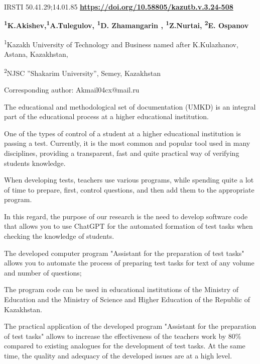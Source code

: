 \newpage
IRSTI 50.41.29;14.01.85
\hfill {\bfseries \href{https://doi.org/10.58805/kazutb.v.3.24-508}{https://doi.org/10.58805/kazutb.v.3.24-508}}


\begin{center}
{\bfseries \textsuperscript{1}K.Akishev\envelope,\textsuperscript{1}A.Тulegulov,
\textsuperscript{1}D. Zhamangarin , \textsuperscript{1}Z.Nurtai,
\textsuperscript{2}E. Ospanov}

\textsuperscript{1}Kazakh University of Technology and Business named
after K.Kulazhanov, Astana, Kazakhstan,

\textsuperscript{2}NJSC ''Shakarim University'', Semey, Kazakhstan
\end{center}
\envelope Corresponding author: Akmail04cx@mail.ru \vspace{0.5cm}

The educational and methodological set of documentation (UMKD) is an
integral part of the educational process at a higher educational
institution.

One of the types of control of a student at a higher educational
institution is passing a test. Currently, it is the most common and
popular tool used in many disciplines, providing a transparent, fast and
quite practical way of verifying students\textquotesingle{} knowledge.

When developing tests, teachers use various programs, while spending
quite a lot of time to prepare, first, control questions, and then add
them to the appropriate program.

In this regard, the purpose of our research is the need to develop
software code that allows you to use ChatGPT for the automated formation
of test tasks when checking the knowledge of students.

The developed computer program "Assistant for the preparation of test
tasks" allows you to automate the process of preparing test tasks for
text of any volume and number of questions;

The program code can be used in educational institutions of the Ministry
of Education and the Ministry of Science and Higher Education of the
Republic of Kazakhstan.

The practical application of the developed program "Assistant for the
preparation of test tasks" allows to increase the effectiveness of the
teacher\textquotesingle s work by 80\% compared to existing analogues
for the development of test tasks. At the same time, the quality and
adequacy of the developed issues are at a high level.

